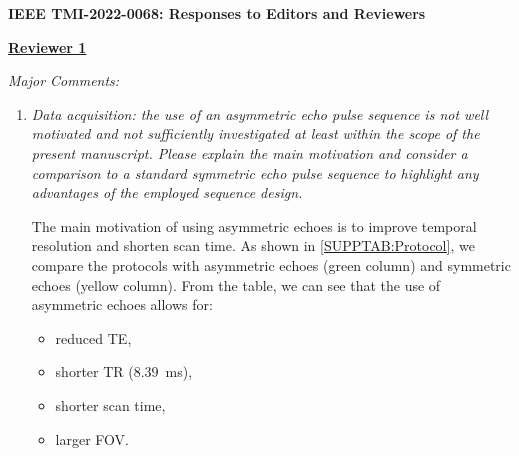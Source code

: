 \documentclass[a4paper,11pt]{report}
\begin{document}
	
\begin{center}
	{\large\textbf{IEEE TMI-2022-0068: Responses to Editors and Reviewers}}
\end{center}




\noindent \underline{\textbf{Reviewer 1}}

\noindent \textit{Major Comments:}

\begin{enumerate}
	\item \textit{Data acquisition: the use of an asymmetric echo pulse sequence is not well motivated and not sufficiently investigated at least within the scope of the present manuscript. Please explain the main motivation and consider a comparison to a standard symmetric echo pulse sequence to highlight any advantages of the employed sequence design.}

\hspace{1em} The main motivation of using asymmetric echoes is 
to improve temporal resolution and shorten scan time. 
As shown in \cref{SUPPTAB:Protocol}, we compare the protocols 
with asymmetric echoes (green column) and 
symmetric echoes (yellow column). 
From the table, we can see that the use of asymmetric echoes allows for:

\begin{itemize}
	\item reduced TE,
	\item shorter TR ($8.39$~ms),
	\item shorter scan time,
	\item larger FOV.
\end{itemize} 


\end{enumerate}
\end{document}
